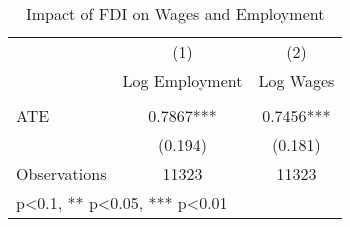 \begin{table}[htbp]\centering
\def\sym#1{\ifmmode^{#1}\else\(^{#1}\)\fi}
\caption{Impact of FDI on Wages and Employment \label{ates}}
\begin{tabular}{l*{2}{c}}
\hline\hline
                &\multicolumn{1}{c}{(1)}&\multicolumn{1}{c}{(2)}\\
                &\multicolumn{1}{c}{Log Employment}&\multicolumn{1}{c}{Log Wages} \\ \hline \\[-1ex]
ATE             &   0.7867***&   0.7456***\\
                &  (0.194)   &  (0.181)   \\
\hline
Observations    &    11323   &    11323   \\
\hline\hline
\multicolumn{3}{l}{\footnotesize * p<0.1, ** p<0.05, *** p<0.01}\\
\end{tabular}
\end{table}
